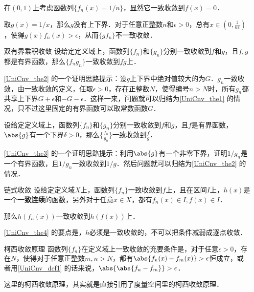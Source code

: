 \begin{example}{}\label{UniCnv_ex3}
在$(0, 1)$上考虑函数列$\{f_n(x)=1/n\}$，显然它一致收敛到$f(x)=0$．

取$g(x)=1/x$，那么$g$没有上下界．对于任意正整数$n$和$\epsilon>0$，总有$x\in(0, \frac{1}{n\epsilon})$，使得$g(x)f_n(x)>\epsilon$，从而$\{gf_n\}$不一致收敛．
\end{example}

\begin{theorem}{双有界乘积收敛}\label{UniCnv_the2}
设给定定义域上，函数列$\{f_n\}$和$\{g_n\}$分别一致收敛到$f$和$g$，且$f, g$都是有界函数，那么$\{f_ng_n\}$一致收敛到$fg$上．
\end{theorem}

\autoref{UniCnv_the2} 的一个证明思路提示：设$g$上下界中绝对值较大的为$G$．$g_n$一致收敛，由一致收敛的定义，任取$\epsilon>0$，存在正整数$N$，使得编号$n>N$时，所有$g_n$都共享上下界$G+\epsilon$和$-G-\epsilon$．这样一来，问题就可以归结为\autoref{UniCnv_the1} 的情况，只不过这里固定的有界函数可以取常数函数$G$．

\begin{theorem}{}\label{UniCnv_the3}
设给定定义域上，函数列$\{f_n\}$和$\{g_n\}$分别一致收敛到$f$和$g$，且$f$是有界函数，$\abs{g}$有一个下界$\delta>0$，那么$\{\frac{f_n}{g_n}\}$一致收敛到$\frac{f}{g}$．
\end{theorem}

\autoref{UniCnv_the3} 的一个证明思路提示：利用$\abs{g}$有一个非零下界，证明$1/g_n$是一个有界函数，且$1/g_n$一致收敛到$1/g$．然后问题就可以归结为\autoref{UniCnv_the2} 的情况．

\begin{theorem}{链式收敛}\label{UniCnv_the4}
设给定定义域$X$上，函数列$\{f_n\}$一致收敛到$f$上，且在区间$I$上，$h(x)$是一个\textbf{一致连续}的函数，另外对于任意$x\in X$，都有$f_n(x)\in I, f(x)\in I$．

那么$h(f_n(x))$一致收敛到$h(f(x))$上．
\end{theorem}

\autoref{UniCnv_the4} 的要点是，$h$必须是一致收敛的，不可以把条件减弱成逐点收敛．

\begin{theorem}{柯西收敛原理}\label{UniCnv_the6}
函数列$\{f_n\}$在定义域上一致收敛的充要条件是，对于任意$\epsilon>0$，存在$N$，使得对于任意正整数$m, n>N$，都有$\abs{f_n(x)-f_m(x)}>\epsilon$恒成立，或者用\autoref{UniCnv_def1} 的话来说，$\abs{\abs{f_n-f_m}}>\epsilon$．
\end{theorem}

这里的柯西收敛原理，其实就是直接引用了度量空间里的柯西收敛原理．

